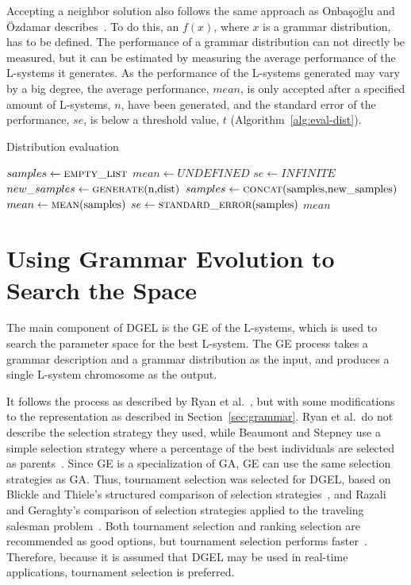 Accepting a neighbor solution also follows the same approach as Onbaşoğlu and Özdamar describes~\cite{2001Onbasoglu}.
To do this, an $f(x)$, where $x$ is a grammar distribution, has to be defined.
The performance of a grammar distribution can not directly be measured, but it can be estimated by measuring the average performance of the \glspl{L-system} it generates.
As the performance of the \glspl{L-system} generated may vary by a big degree, the average performance, $mean$, is only accepted after a specified amount of \glspl{L-system}, $n$, have been generated, and the standard error of the performance, $se$, is below a threshold value, $t$ (Algorithm~\ref{alg:eval-dist}).

\begin{algorithm}
\caption{Distribution evaluation}
\label{alg:eval-dist}
\begin{algorithmic}
    \State $samples\gets \Call{empty\_list}{}$
    \State $mean\gets UNDEFINED$
    \State $se\gets INFINITE$
        \State $new\_samples\gets \Call{generate}{$n$, $dist$}$
        \State $samples\gets \Call{concat}{$samples$, $new\_samples$}$
        \State $mean\gets \Call{mean}{$samples$}$
        \State $se\gets \Call{standard\_error}{$samples$}$
    \EndWhile
    \State \Return $mean$
\EndFunction
\end{algorithmic}
\end{algorithm}

\section{Using Grammar Evolution to Search the Space}
The main component of \gls{DGEL} is the \gls{GE} of the \glspl{L-system}, which is used to search the parameter space for the best \gls{L-system}.
The \gls{GE} process takes a grammar description and a grammar distribution as the input, and produces a single \gls{L-system} chromosome as the output.

It follows the process as described by Ryan et al.~\cite{1998Ryan}, but with some modifications to the representation as described in Section~\ref{sec:grammar}.
Ryan et al.\ do not describe the selection strategy they used, while Beaumont and Stepney use a simple selection strategy where a percentage of the best individuals are selected as parents~\cite{2009Beaumont}.
Since \gls{GE} is a specialization of \gls{GA}, \gls{GE} can use the same selection strategies as \gls{GA}.
Thus, tournament selection was selected for \gls{DGEL}, based on Blickle and Thiele's structured comparison of selection strategies~\cite{1995Blickle}, and Razali and Geraghty's comparison of selection strategies applied to the traveling salesman problem~\cite{2011Razali}.
Both tournament selection and ranking selection are recommended as good options, but tournament selection performs faster~\cite{1995Blickle}.
Therefore, because it is assumed that \gls{DGEL} may be used in real-time applications, tournament selection is preferred.

